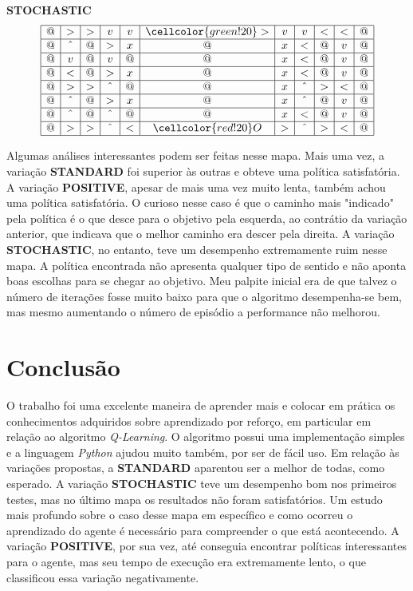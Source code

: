 \documentclass{article}
\begin{document}
\small \textbf{STOCHASTIC}
\[
	\begin{array}{|c|c|c|c|c|c|c|c|c|c|c|c|}
		\hline
		@ & >      & > & v      & v & \cellcolor{green!20}> & v & v      & < & < & @ \\ \hline
		@ & \hat{} & @ & >      & x & @                     & x & <      & @ & v & @ \\ \hline
		@ & v      & @ & v      & @ & @                     & x & <      & @ & v & @ \\ \hline
		@ & <      & @ & >      & x & @                     & x & <      & @ & v & @ \\ \hline
		@ & >      & > & \hat{} & @ & @                     & x & \hat{} & > & < & @ \\ \hline
		@ & \hat{} & @ & >      & x & @                     & x & \hat{} & @ & v & @ \\ \hline
		@ & \hat{} & @ & \hat{} & @ & @                     & x & <      & @ & v & @ \\ \hline
		@ & >      & > & \hat{} & < & \cellcolor{red!20}O   & > & \hat{} & > & < & @ \\ \hline
	\end{array}
\]

Algumas análises interessantes podem ser feitas nesse mapa. Mais uma vez, a variação \textbf{STANDARD} foi superior às outras e obteve uma política satisfatória. A variação \textbf{POSITIVE}, apesar de mais uma vez muito lenta,
também achou uma política satisfatória. O curioso nesse caso é que o caminho mais "indicado" pela política é o que desce para o objetivo pela esquerda, ao contrátio da variação anterior, que indicava que o melhor caminho era descer pela direita.
A variação \textbf{STOCHASTIC}, no entanto, teve um desempenho extremamente ruim nesse mapa. A política encontrada não apresenta qualquer tipo de sentido e não aponta boas escolhas para se chegar ao objetivo. Meu palpite inicial era de que talvez o número de iterações fosse muito baixo para que
o algoritmo desempenha-se bem, mas mesmo aumentando o número de episódio a performance não melhorou.


\section{Conclusão}

O trabalho foi uma excelente maneira de aprender mais e colocar em prática os conhecimentos adquiridos sobre aprendizado por reforço, em particular em relação ao algoritmo \textit{Q-Learning}. O algoritmo possui uma implementação simples e a linguagem \textit{Python} ajudou muito também,
por ser de fácil uso. Em relação às variações propostas, a \textbf{STANDARD} aparentou ser a melhor de todas, como esperado. A variação \textbf{STOCHASTIC} teve um desempenho bom nos primeiros testes, mas no último mapa os resultados não foram satisfatórios. Um estudo mais profundo sobre o caso desse mapa em específico
e como ocorreu o aprendizado do agente é necessário para compreender o que está acontecendo. A variação \textbf{POSITIVE}, por sua vez, até conseguia encontrar políticas interessantes para o agente, mas seu tempo de execução era extremamente lento, o que classificou essa variação negativamente.
\end{document}
